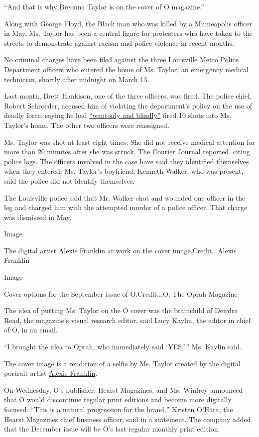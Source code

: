 ``And that is why Breonna Taylor is on the cover of O magazine.''

Along with George Floyd, the Black man who was killed by a Minneapolis
officer in May, Ms. Taylor has been a central figure for protesters who
have taken to the streets to demonstrate against racism and police
violence in recent months.

No criminal charges have been filed against the three Louisville Metro
Police Department officers who entered the home of Ms. Taylor, an
emergency medical technician, shortly after midnight on March 13.

Last month, Brett Hankison, one of the three officers, was fired. The
police chief, Robert Schroeder, accused him of violating the
department's policy on the use of deadly force, saying he had
\href{https://www.nytimes.com/2020/06/23/us/breonna-taylor-brett-hankison-fired.html}{``wantonly
and blindly''} fired 10 shots into Ms. Taylor's home. The other two
officers were reassigned.

Ms. Taylor was shot at least eight times. She did not receive medical
attention for more than 20 minutes after she was struck, The Courier
Journal reported, citing police logs. The officers involved in the case
have said they identified themselves when they entered; Ms. Taylor's
boyfriend, Kenneth Walker, who was present, said the police did not
identify themselves.

The Louisville police said that Mr. Walker shot and wounded one officer
in the leg and charged him with the attempted murder of a police
officer. That charge was dismissed in May.

Image

The digital artist Alexis Franklin at work on the cover
image.Credit...Alexis Franklin

Image

Cover options for the September issue of O.Credit...O, The Oprah
Magazine

The idea of putting Ms. Taylor on the O cover was the brainchild of
Deirdre Read, the magazine's visual research editor, said Lucy Kaylin,
the editor in chief of O, in an email.

``I brought the idea to Oprah, who immediately said `YES,''' Ms. Kaylin
said.

The cover image is a rendition of a selfie by Ms. Taylor created by the
digital portrait artist
\href{https://www.oprahmag.com/life/a33449982/oprah-breonna-taylor/}{Alexis
Franklin}.

On Wednesday, O's publisher, Hearst Magazines, and Ms. Winfrey announced
that O would discontinue regular print editions and become more
digitally focused. ``This is a natural progression for the brand,''
Kristen O'Hara, the Hearst Magazines chief business officer, said in a
statement. The company added that the December issue will be O's last
regular monthly print edition.

